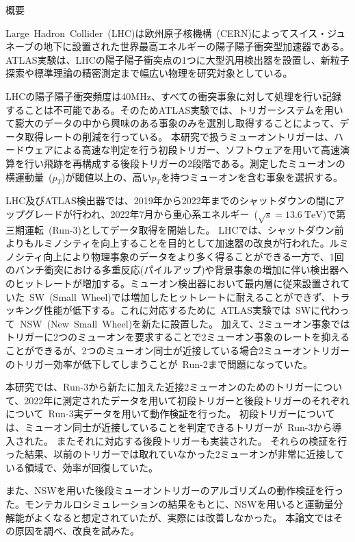 \begin{center}
  \begin{LARGE}
    概要
  \end{LARGE}
\end{center}

\vspace{10pt}

Large~Hadron~Collider~(LHC)は欧州原子核機構~(CERN)によってスイス・ジュネーブの地下に設置された世界最高エネルギーの陽子陽子衝突型加速器である。ATLAS実験は、LHCの陽子陽子衝突点の1つに大型汎用検出器を設置し、新粒子探索や標準理論の精密測定まで幅広い物理を研究対象としている。

LHCの陽子陽子衝突頻度は40MHz、すべての衝突事象に対して処理を行い記録することは不可能である。そのためATLAS実験では、トリガーシステムを用いて膨大のデータの中から興味のある事象のみを選別し取得することによって、データ取得レートの削減を行っている。
本研究で扱うミューオントリガーは、ハードウェアによる高速な判定を行う初段トリガー、ソフトウェアを用いて高速演算を行い飛跡を再構成する後段トリガーの2段階である。測定したミューオンの横運動量~($p_{T}$)が閾値以上の、高い$p_{T}$を持つミューオンを含む事象を選択する。

LHC及びATLAS検出器では、2019年から2022年までのシャットダウンの間にアップグレードが行われ、2022年7月から重心系エネルギー~($\sqrt{s}=\SI{13.6}{\TeV}$)で第三期運転~(Run-3)としてデータ取得を開始した。
LHCでは、シャットダウン前よりもルミノシティを向上することを目的として加速器の改良が行われた。ルミノシティ向上により物理事象のデータをより多く得ることができる一方で、1回のバンチ衝突における多重反応(パイルアップ)や背景事象の増加に伴い検出器へのヒットレートが増加する。ミューオン検出器において最内層に従来設置されていた~SW~(Small~Wheel)では増加したヒットレートに耐えることができず、トラッキング性能が低下する。これに対応するために~ATLAS実験では~SWに代わって~NSW~(New~Small~Wheel)を新たに設置した。
加えて、2ミューオン事象ではトリガーに2つのミューオンを要求することで2ミューオン事象のレートを抑えることができるが、2つのミューオン同士が近接している場合2ミューオントリガーのトリガー効率が低下してしまうことが~Run-2まで問題になっていた。


本研究では、Run-3から新たに加えた近接2ミューオンのためのトリガーについて、2022年に測定されたデータを用いて初段トリガーと後段トリガーのそれぞれについて~Run-3実データを用いて動作検証を行った。
初段トリガーについては、ミューオン同士が近接していることを判定できるトリガーが~Run-3から導入された。
またそれに対応する後段トリガーも実装された。
それらの検証を行った結果、以前のトリガーでは取れていなかった2ミューオンが非常に近接している領域で、効率が回復していた。

また、NSWを用いた後段ミューオントリガーのアルゴリズムの動作検証を行った。モンテカルロシミュレーションの結果をもとに、NSWを用いると運動量分解能がよくなると想定されていたが、実際には改善しなかった。
本論文ではその原因を調べ、改良を試みた。